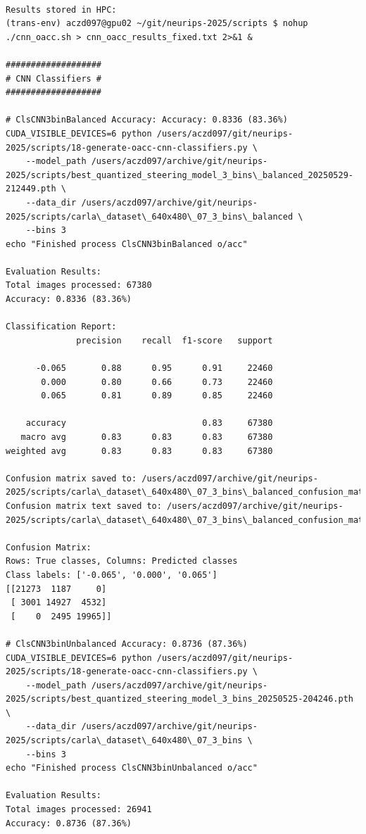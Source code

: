 \begin{verbatim}

Results stored in HPC:
(trans-env) aczd097@gpu02 ~/git/neurips-2025/scripts $ nohup ./cnn_oacc.sh > cnn_oacc_results_fixed.txt 2>&1 &

###################
# CNN Classifiers #
###################

# ClsCNN3binBalanced Accuracy: Accuracy: 0.8336 (83.36%)
CUDA_VISIBLE_DEVICES=6 python /users/aczd097/git/neurips-2025/scripts/18-generate-oacc-cnn-classifiers.py \
    --model_path /users/aczd097/archive/git/neurips-2025/scripts/best_quantized_steering_model_3_bins\_balanced_20250529-212449.pth \
    --data_dir /users/aczd097/archive/git/neurips-2025/scripts/carla\_dataset\_640x480\_07_3_bins\_balanced \
    --bins 3
echo "Finished process ClsCNN3binBalanced o/acc"

Evaluation Results:
Total images processed: 67380
Accuracy: 0.8336 (83.36%)

Classification Report:
              precision    recall  f1-score   support

      -0.065       0.88      0.95      0.91     22460
       0.000       0.80      0.66      0.73     22460
       0.065       0.81      0.89      0.85     22460

    accuracy                           0.83     67380
   macro avg       0.83      0.83      0.83     67380
weighted avg       0.83      0.83      0.83     67380

Confusion matrix saved to: /users/aczd097/archive/git/neurips-2025/scripts/carla\_dataset\_640x480\_07_3_bins\_balanced_confusion_matrix.png
Confusion matrix text saved to: /users/aczd097/archive/git/neurips-2025/scripts/carla\_dataset\_640x480\_07_3_bins\_balanced_confusion_matrix.txt

Confusion Matrix:
Rows: True classes, Columns: Predicted classes
Class labels: ['-0.065', '0.000', '0.065']
[[21273  1187     0]
 [ 3001 14927  4532]
 [    0  2495 19965]]

# ClsCNN3binUnbalanced Accuracy: 0.8736 (87.36%)
CUDA_VISIBLE_DEVICES=6 python /users/aczd097/git/neurips-2025/scripts/18-generate-oacc-cnn-classifiers.py \
    --model_path /users/aczd097/archive/git/neurips-2025/scripts/best_quantized_steering_model_3_bins_20250525-204246.pth \
    --data_dir /users/aczd097/archive/git/neurips-2025/scripts/carla\_dataset\_640x480\_07_3_bins \
    --bins 3
echo "Finished process ClsCNN3binUnbalanced o/acc"

Evaluation Results:
Total images processed: 26941
Accuracy: 0.8736 (87.36%)


\end{verbatim}
